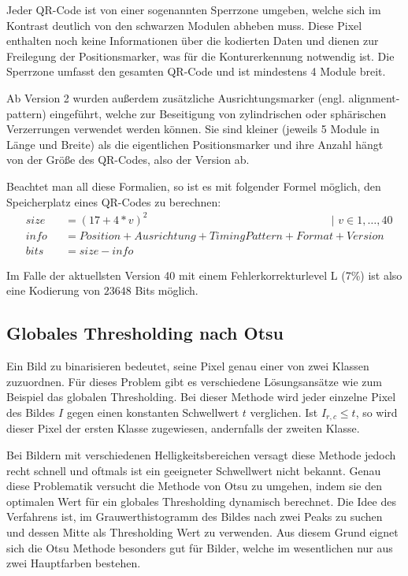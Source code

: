 \documentclass[a4paper, oneside, 12pt]{article}
\begin{document}
Jeder QR-Code ist von einer sogenannten Sperrzone umgeben, welche sich im Kontrast deutlich von den schwarzen Modulen abheben muss. Diese Pixel enthalten noch keine Informationen über die kodierten Daten und dienen zur Freilegung der Positionsmarker, was für die Konturerkennung notwendig ist. Die Sperrzone umfasst den gesamten QR-Code und ist mindestens 4 Module breit.

Ab Version 2 wurden außerdem zusätzliche Ausrichtungsmarker (engl. alignment-pattern) eingeführt, welche zur Beseitigung von zylindrischen oder sphärischen Verzerrungen verwendet werden können. Sie sind kleiner (jeweils 5 Module in Länge und Breite) als die eigentlichen Positionsmarker und ihre Anzahl hängt von der Größe des QR-Codes, also der Version ab.

Beachtet man all diese Formalien, so ist es mit folgender Formel möglich, den Speicherplatz eines QR-Codes zu berechnen:
\begin{align*}
&size &&= (17 + 4 * v)^2 \hspace{200pt} | \,\, v \in 1,\dots,40\\
&info &&= Position + Ausrichtung + TimingPattern + Format + Version\\
&bits &&= size - info
\end{align*}

Im Falle der aktuellsten Version 40 mit einem Fehlerkorrekturlevel L (7\%) ist also eine Kodierung von $23648$ Bits möglich.

\subsection{Globales Thresholding nach Otsu}
\label{ss:otsu}

Ein Bild zu binarisieren bedeutet, seine Pixel genau einer von zwei Klassen zuzuordnen. Für dieses Problem gibt es verschiedene Lösungsansätze wie zum Beispiel das globalen Thresholding. Bei dieser Methode wird jeder einzelne Pixel des Bildes $I$ gegen einen konstanten Schwellwert $t$ verglichen. Ist $I_{r,c} \leq t$, so wird dieser Pixel der ersten Klasse zugewiesen, andernfalls der zweiten Klasse.

Bei Bildern mit verschiedenen Helligkeitsbereichen versagt diese Methode jedoch recht schnell und oftmals ist ein geeigneter Schwellwert nicht bekannt. Genau diese Problematik versucht die Methode von Otsu \cite{otsu1975threshold} zu umgehen, indem sie den optimalen Wert für ein globales Thresholding dynamisch berechnet. Die Idee des Verfahrens ist, im Grauwerthistogramm des Bildes nach zwei Peaks zu suchen und dessen Mitte als Thresholding Wert zu verwenden. Aus diesem Grund eignet sich die Otsu Methode besonders gut für Bilder, welche im wesentlichen nur aus zwei Hauptfarben bestehen.
\end{document}
